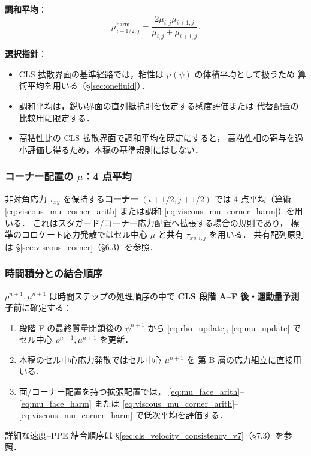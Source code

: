 \noindent\textbf{調和平均}：
\begin{equation}
  \mu_{i+1/2,j}^\text{harm} = \frac{2\mu_{i,j}\mu_{i+1,j}}{\mu_{i,j}+\mu_{i+1,j}}.
  \label{eq:mu_face_harm}
\end{equation}

\noindent\textbf{選択指針}：
\begin{itemize}
  \item CLS 拡散界面の基準経路では，粘性は $\mu(\psi)$ の体積平均として扱うため
        算術平均を用いる（§\ref{sec:onefluid}）．
  \item 調和平均は，鋭い界面の直列抵抗則を仮定する感度評価または
        代替配置の比較用に限定する．
  \item 高粘性比の CLS 拡散界面で調和平均を既定にすると，
        高粘性相の寄与を過小評価し得るため，本稿の基準規則にはしない．
\end{itemize}

\subsubsection{\texorpdfstring{コーナー配置の $\mu$：4 点平均}{コーナー配置の μ：4 点平均}}
\label{sec:mu_corner_interpolation}

非対角応力 $\tau_{xy}$ を保持する\textbf{コーナー} $(i+1/2, j+1/2)$ では
4 点平均（算術 \eqref{eq:viscous_mu_corner_arith} または調和
\eqref{eq:viscous_mu_corner_harm}）を用いる．
これはスタガード/コーナー応力配置へ拡張する場合の規則であり，
標準のコロケート応力発散ではセル中心 $\mu$ と共有 $\tau_{xy,i,j}$ を用いる．
共有配列原則は \S\ref{sec:viscous_corner}（§6.3）を参照．

\subsubsection{時間積分との結合順序}
\label{sec:rho_mu_time_integration}

$\rho^{n+1}, \mu^{n+1}$ は時間ステップの処理順序の中で
\textbf{CLS 段階 A--F 後・運動量予測子前}に確定する：
\begin{enumerate}
  \item 段階 F の最終質量閉鎖後の $\psi^{n+1}$ から \eqref{eq:rho_update}, \eqref{eq:mu_update}
        でセル中心 $\rho^{n+1}, \mu^{n+1}$ を更新．
  \item 本稿のセル中心応力発散ではセル中心 $\mu^{n+1}$ を
        第 B 層の応力組立に直接用いる．
  \item 面/コーナー配置を持つ拡張配置では，
        \eqref{eq:mu_face_arith}--\eqref{eq:mu_face_harm} または
        \eqref{eq:viscous_mu_corner_arith}--\eqref{eq:viscous_mu_corner_harm}
        で低次平均を評価する．
\end{enumerate}
詳細な速度--PPE 結合順序は
\S\ref{sec:cls_velocity_consistency_v7}（§7.3）を参照．

